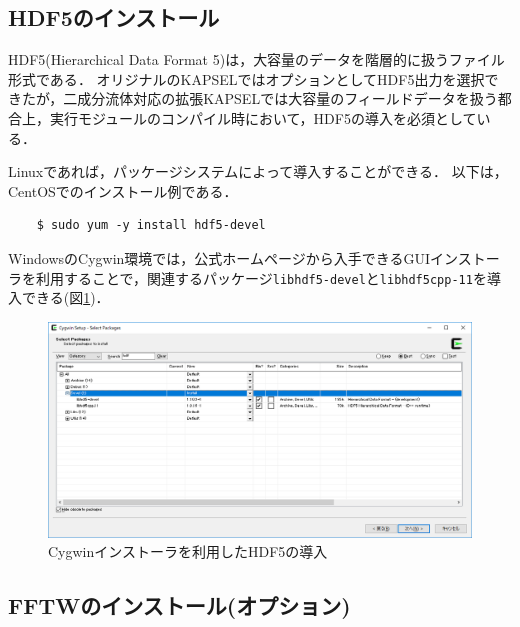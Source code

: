 \documentclass[pdflatex,a4paper,10pt,ja=standard]{bxjsarticle}
\begin{document}
\subsection{HDF5のインストール}
HDF5(Hierarchical Data Format 5)は，大容量のデータを階層的に扱うファイル形式である\autocite{hdf5}．
オリジナルのKAPSELではオプションとしてHDF5出力を選択できたが，二成分流体対応の拡張KAPSELでは大容量のフィールドデータを扱う都合上，実行モジュールのコンパイル時において，HDF5の導入を必須としている．

Linuxであれば，パッケージシステムによって導入することができる．
以下は，CentOSでのインストール例である．
\begin{verbatim}
    $ sudo yum -y install hdf5-devel
\end{verbatim}
WindowsのCygwin環境では，公式ホームページ\autocite{cygwin}から入手できるGUIインストーラを利用することで，関連するパッケージ\verb|libhdf5-devel|と\verb|libhdf5cpp-11|を導入できる(図\ref{fig:cygwin_install})．
\begin{figure}[htbp]
    \centering
    \includegraphics[width=14truecm]{cygwin_ss.png}
    \caption{Cygwinインストーラを利用したHDF5の導入}
    \label{fig:cygwin_install}
\end{figure}

\subsection{FFTWのインストール(オプション)}
\label{sec:fftw}
\end{document}
